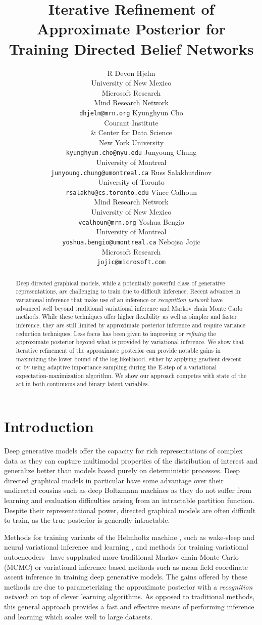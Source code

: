 \documentclass{article} %
\title{Iterative Refinement of \\ Approximate Posterior for \\ Training Directed Belief Networks}
\author{R Devon Hjelm \\
University of New Mexico \\  Microsoft Research \\ Mind Research Network \\
\texttt{\small dhjelm@mrn.org} 
\And
Kyunghyun Cho \\
Courant Institute \\ \& Center for Data Science \\
New York University \\
\texttt{\small kyunghyun.cho@nyu.edu}
\And
Junyoung Chung \\
University of Montreal \\
\texttt{\small junyoung.chung@umontreal.ca}
\And
Russ Salakhutdinov \\
University of Toronto \\
\texttt{\small rsalakhu@cs.toronto.edu}
\And
Vince Calhoun \\
Mind Research Network \\ University of New Mexico \\
\texttt{\small vcalhoun@mrn.org}
\And
Yoshua Bengio \\
University of Montreal \\
\texttt{\small yoshua.bengio@umontreal.ca}
\And
Nebojsa Jojic \\
Microsoft Research \\
\texttt{\small jojic@microsoft.com}
}
\begin{document}
\maketitle

\begin{abstract}
    Deep directed graphical models, while a potentially powerful
    class of generative representations, are challenging to train due to difficult inference. Recent advances in variational inference that make use
    of an inference or \emph{recognition network} have advanced well beyond
    traditional variational inference and Markov chain Monte Carlo methods. While these techniques
    offer higher flexibility as well as simpler and faster inference, they are
    still limited by approximate posterior inference and require variance
    reduction techniques. Less focus has been given to improving or \emph{refining} the
    approximate posterior beyond what is provided by variational inference. We
    show that iterative refinement of the approximate posterior can provide
    notable gains in maximizing the lower bound of the log likelihood, either
    by applying gradient descent or by using adaptive importance sampling
    during the E-step of a variational expectation-maximization algorithm. We show our approach
    competes with state of the art in both continuous and binary latent
    variables.
    \end{abstract}

\section{Introduction}

Deep generative models offer the capacity for rich representations of complex
data as they can capture multimodal properties of the distribution of
interest and generalize better than models based purely on deterministic processes. Deep directed
graphical models in particular have some advantage over their undirected
cousins such as deep Boltzmann machines \citep[DBMs,][]{salakhutdinov2009deep} as they do not suffer from
learning and evaluation difficulties arising from an intractable partition
function. Despite their representational power, directed graphical models are
often difficult to train, as the true posterior is generally intractable.

Methods for training variants of the Helmholtz machine
\citep{dayan1995helmholtz}, such as wake-sleep \citep{hinton1995wake,
bornschein2014reweighted} and neural variational inference and learning
\citep[NVIL,][]{mnih2014neural}, and methods for training variational
autoencoders~ \citep[VAE,][]{kingma2013auto} have supplanted more traditional
Markov chain Monte Carlo (MCMC) \citep{neal1992connectionist} or variational
inference based methods such as mean field coordinate ascent inference
\citep{saul1996mean} in training deep generative models. The gains offered by
these methods are due to parameterizing the approximate posterior with a
\emph{recognition network} on top of clever learning algorithms. As opposed to
traditional methods, this general approach provides a fast and effective means
of performing inference and learning which scales well to large datasets.
\end{document}

